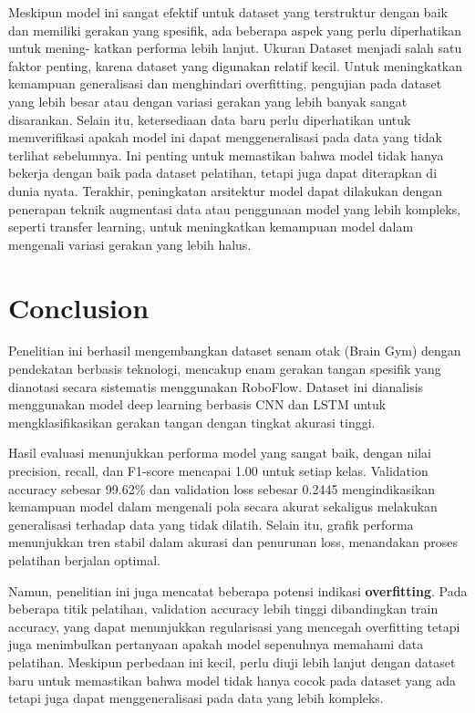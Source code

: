 \documentclass[12pt,a4paper]{article}
\begin{document}
Meskipun model ini sangat efektif untuk dataset yang terstruktur dengan baik dan memiliki gerakan yang spesifik, ada beberapa aspek yang perlu diperhatikan untuk mening- katkan performa lebih lanjut. Ukuran Dataset menjadi salah satu faktor penting, karena dataset yang digunakan relatif kecil. Untuk meningkatkan kemampuan generalisasi dan menghindari overfitting, pengujian pada dataset yang lebih besar atau dengan variasi gerakan yang lebih banyak sangat disarankan. Selain itu, ketersediaan data baru perlu diperhatikan untuk memverifikasi apakah model ini dapat menggeneralisasi pada data yang tidak terlihat sebelumnya. Ini penting untuk memastikan bahwa model tidak hanya bekerja dengan baik pada dataset pelatihan, tetapi juga dapat diterapkan di dunia nyata. Terakhir, peningkatan arsitektur model dapat dilakukan dengan penerapan teknik augmentasi data atau penggunaan model yang lebih kompleks, seperti transfer learning, untuk meningkatkan kemampuan model dalam mengenali variasi gerakan yang lebih halus.

\newpage
\section{ Conclusion}
Penelitian ini berhasil mengembangkan dataset senam otak (Brain Gym) dengan pendekatan berbasis teknologi, mencakup enam gerakan tangan spesifik yang dianotasi secara sistematis menggunakan RoboFlow. Dataset ini dianalisis menggunakan model deep learning berbasis CNN dan LSTM untuk mengklasifikasikan gerakan tangan dengan tingkat akurasi tinggi.

Hasil evaluasi menunjukkan performa model yang sangat baik, dengan nilai precision, recall, dan F1-score mencapai 1.00 untuk setiap kelas. Validation accuracy sebesar 99.62\% dan validation loss sebesar 0.2445 mengindikasikan kemampuan model dalam mengenali pola secara akurat sekaligus melakukan generalisasi terhadap data yang tidak dilatih. Selain itu, grafik performa menunjukkan tren stabil dalam akurasi dan penurunan loss, menandakan proses pelatihan berjalan optimal.

Namun, penelitian ini juga mencatat beberapa potensi indikasi \textbf{overfitting}. Pada beberapa titik pelatihan, validation accuracy lebih tinggi dibandingkan train accuracy, yang dapat menunjukkan regularisasi yang mencegah overfitting tetapi juga menimbulkan pertanyaan apakah model sepenuhnya memahami data pelatihan. Meskipun perbedaan ini kecil, perlu diuji lebih lanjut dengan dataset baru untuk memastikan bahwa model tidak hanya cocok pada dataset yang ada tetapi juga dapat menggeneralisasi pada data yang lebih kompleks.
\end{document}
